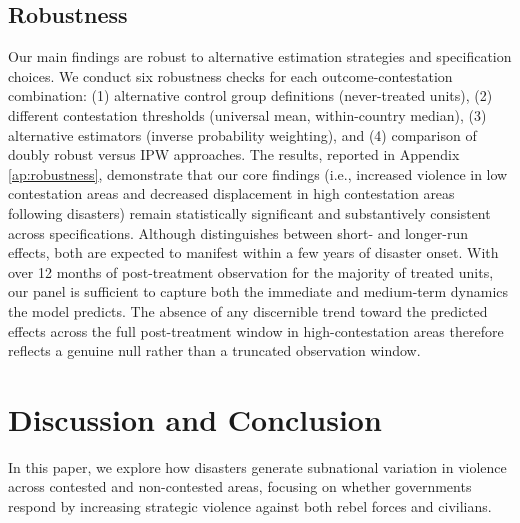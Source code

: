 \documentclass[bibtex]{article}
\begin{document}
{\subsection*{Robustness}

Our main findings are robust to alternative estimation strategies and specification choices. We conduct six robustness checks for each outcome-contestation combination: (1) alternative control group definitions (never-treated units), (2) different contestation thresholds (universal mean, within-country median), (3) alternative estimators (inverse probability weighting), and (4) comparison of doubly robust versus IPW approaches. The results, reported in Appendix \ref{ap:robustness}, demonstrate that our core findings (i.e., increased violence in low contestation areas and decreased displacement in high contestation areas following disasters) remain statistically significant and substantively consistent across specifications. Although \cite{sun2024strategic} distinguishes between short- and longer-run effects, both are expected to manifest within a few years of disaster onset. With over 12 months of post-treatment observation for the majority of treated units, our panel is sufficient to capture both the immediate and medium-term dynamics the model predicts. The absence of any discernible trend toward the predicted effects across the full post-treatment window in high-contestation areas therefore reflects a genuine null rather than a truncated observation window.

\section*{Discussion and Conclusion}

In this paper, we explore how disasters generate subnational variation in violence across contested and non-contested areas, focusing on whether governments respond by increasing strategic violence against both rebel forces and civilians.



}
\end{document}
